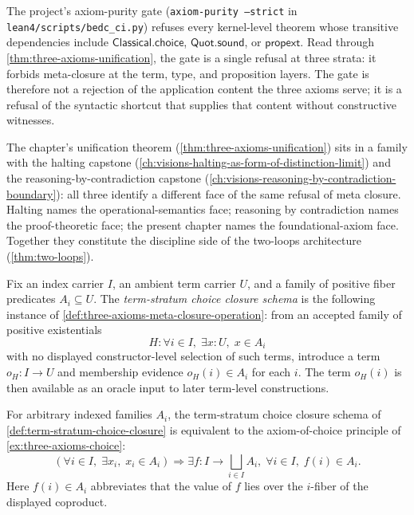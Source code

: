 \begin{remark}
\label{rem:three-axioms-gate-meaning}
The project's axiom-purity gate (\texttt{axiom-purity --strict} in \texttt{lean4/scripts/bedc\_ci.py}) refuses every kernel-level theorem whose transitive dependencies include $\mathsf{Classical.choice}$, $\mathsf{Quot.sound}$, or $\mathsf{propext}$. Read through \autoref{thm:three-axioms-unification}, the gate is a single refusal at three strata: it forbids meta-closure at the term, type, and proposition layers. The gate is therefore not a rejection of the application content the three axioms serve; it is a refusal of the syntactic shortcut that supplies that content without constructive witnesses.
\end{remark}

\begin{remark}
\label{rem:three-axioms-siblings}
The chapter's unification theorem (\autoref{thm:three-axioms-unification}) sits in a family with the halting capstone (\autoref{ch:visions-halting-as-form-of-distinction-limit}) and the reasoning-by-contradiction capstone (\autoref{ch:visions-reasoning-by-contradiction-boundary}): all three identify a different face of the same refusal of meta closure. Halting names the operational-semantics face; reasoning by contradiction names the proof-theoretic face; the present chapter names the foundational-axiom face. Together they constitute the discipline side of the two-loops architecture (\autoref{thm:two-loops}).
\end{remark}

\begin{definition}
\label{def:term-stratum-choice-closure}
Fix an index carrier $I$, an ambient term carrier $U$, and a family of positive fiber predicates $A_i \subseteq U$. The \emph{term-stratum choice closure schema} is the following instance of \autoref{def:three-axioms-meta-closure-operation}: from an accepted family of positive existentials
$$
H:\forall i \in I,\; \exists x:U,\; x \in A_i
$$
with no displayed constructor-level selection of such terms, introduce a term $o_H:I\to U$ and membership evidence $o_H(i)\in A_i$ for each $i$. The term $o_H(i)$ is then available as an oracle input to later term-level constructions.
\end{definition}

\begin{theorem}
\label{thm:choice-term-stratum-meta-closure}
For arbitrary indexed families $A_i$, the term-stratum choice closure schema of \autoref{def:term-stratum-choice-closure} is equivalent to the axiom-of-choice principle of \autoref{ex:three-axioms-choice}:
$$
\left(\forall i \in I,\; \exists x_i,\; x_i \in A_i\right)
\Longrightarrow
\exists f:I\to\bigsqcup_{i\in I} A_i,\; \forall i\in I,\; f(i)\in A_i.
$$
Here $f(i)\in A_i$ abbreviates that the value of $f$ lies over the $i$-fiber of the displayed coproduct.
\end{theorem}

